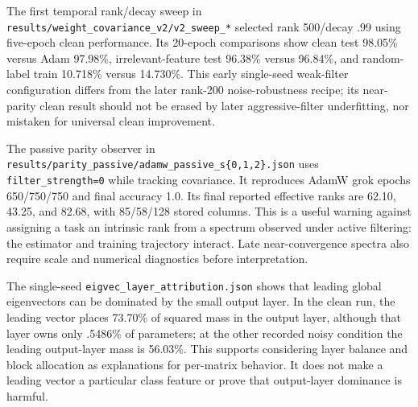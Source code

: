 \documentclass[
  british,
  10pt,
  a4paper,
]{article}
\begin{document}
The first temporal rank/decay sweep in
\texttt{results/\allowbreak{}weight\_\allowbreak{}covariance\_\allowbreak{}v2/\allowbreak{}v2\_\allowbreak{}sweep\_\allowbreak{}*}
selected rank 500/decay .99 using five-epoch clean
performance.\allowbreak{} Its 20-epoch comparisons show clean test
98.05\% versus Adam 97.98\%, irrelevant-\allowbreak{}feature test
96.38\% versus 96.84\%, and random-\allowbreak{}label train 10.718\%
versus 14.730\%. This early single-\allowbreak{}seed
weak-\allowbreak{}filter configuration differs from the later rank-200
noise-\allowbreak{}robustness recipe; its near-\allowbreak{}parity clean
result should not be erased by later aggressive-\allowbreak{}filter
underfitting\allowbreak{},\allowbreak{} nor mistaken for universal clean
improvement.\allowbreak{}

The passive parity observer in
\texttt{results/\allowbreak{}parity\_\allowbreak{}passive/\allowbreak{}adamw\_\allowbreak{}passive\_\allowbreak{}s\{\allowbreak{}0,\allowbreak{}1,\allowbreak{}2\}\allowbreak{}.\allowbreak{}json}
uses \texttt{filter\_\allowbreak{}strength=\allowbreak{}0} while
tracking covariance.\allowbreak{} It reproduces AdamW grok epochs
650/\allowbreak{}750/\allowbreak{}750 and final accuracy 1.0. Its final
reported effective ranks are 62.10, 43.25, and 82.68, with 85/58/128
stored columns. This is a useful warning against assigning a task an
intrinsic rank from a spectrum observed under active filtering: the
estimator and training trajectory interact. Late
near-\allowbreak{}convergence spectra also require scale and numerical
diagnostics before interpretati\allowbreak{}on.\allowbreak{}

The single-\allowbreak{}seed
\texttt{eigvec\_\allowbreak{}layer\_\allowbreak{}attribution.\allowbreak{}json}
shows that leading global eigenvectors can be dominated by the small
output layer. In the clean run, the leading vector places 73.70\% of
squared mass in the output layer, although that layer owns only .5486\%
of parameters; at the other recorded noisy condition the leading
output-\allowbreak{}layer mass is 56.03\%. This supports considering
layer balance and block allocation as explanations for per-matrix
behavior. It does not make a leading vector a particular class feature
or prove that output-\allowbreak{}layer dominance is harmful.
\end{document}
